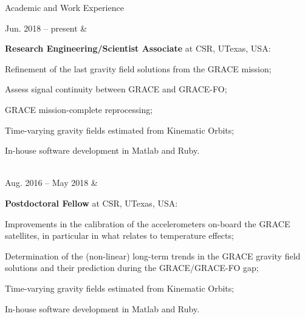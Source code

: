 \documentclass[a4paper,12pt]{article}
\begin{document}

\clearpage


\begin{cvsection}{Academic and Work Experience}

Jun. 2018 -- present &
  \begin{itti}
    \item \textbf{Research Engineering/Scientist Associate} at \acf{CSR}, \acf{UTexas}, \ac{USA}:
    \begin{ittib}
      \item Refinement of the last gravity field solutions from the GRACE mission;
      \item Assess signal continuity between \ac{GRACE} and \acf{GRACE-FO};
      \item \acf{GRACE} mission-complete reprocessing;
      \item Time-varying gravity fields estimated from Kinematic Orbits;
      \item In-house software development in Matlab and Ruby.
    \end{ittib}
  \end{itti}\\

Aug. 2016 -- May 2018 &
  \begin{itti}
    \item \textbf{Postdoctoral Fellow} at \acf{CSR}, \acf{UTexas}, \ac{USA}:
    \begin{ittib}
      \item Improvements in the calibration of the accelerometers on-board the \acf{GRACE} satellites, in particular in what relates to temperature effects;
      \item Determination of the (non-linear) long-term trends in the \ac{GRACE} gravity field solutions and their prediction during the \ac{GRACE}\slash\acf{GRACE-FO} gap;
      \item Time-varying gravity fields estimated from Kinematic Orbits;
      \item In-house software development in Matlab and Ruby.
    \end{ittib}
  \end{itti}\\


\end{cvsection}
\end{document}
